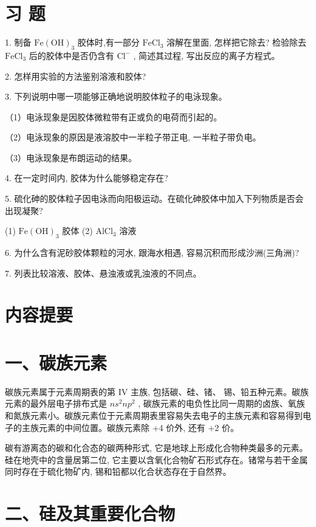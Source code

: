 \documentclass[10pt]{article}
\begin{document}
\section*{习 题}

1. 制备 \(\mathrm{{Fe}}{\left( \mathrm{{OH}}\right) }_{3}\) 胶体时,有一部分 \({\mathrm{{FeCl}}}_{3}\) 溶解在里面, 怎样把它除去? 检验除去 \({\mathrm{{FeCl}}}_{3}\) 后的胶体中是否仍含有 \({\mathrm{{Cl}}}^{ - }\) , 简述其过程, 写出反应的离子方程式。

2. 怎样用实验的方法鉴别溶液和胶体?

3. 下列说明中哪一项能够正确地说明胶体粒子的电泳现象。

（1）电泳现象是因胶体微粒带有正或负的电荷而引起的。

（2）电泳现象的原因是液溶胶中一半粒子带正电, 一半粒子带负电。

（3）电泳现象是布朗运动的结果。

4. 在一定时间内, 胶体为什么能够稳定存在?

5. 硫化砷的胶体粒子因电泳而向阳极运动。在硫化砷胶体中加入下列物质是否会出现凝聚?

(1) \(\mathrm{{Fe}}{\left( \mathrm{{OH}}\right) }_{3}\) 胶体 (2) \({\mathrm{{AlCl}}}_{3}\) 溶液

6. 为什么含有泥砂胶体颗粒的河水, 跟海水相遇, 容易沉积而形成沙洲(三角洲)?

7. 列表比较溶液、胶体、悬浊液或乳浊液的不同点。

\section*{内容提要}

\section*{一、碳族元素}

碳族元素属于元素周期表的第 IV 主族, 包括碳、硅、锗、 锡、铅五种元素。碳族元素的最外层电子排布式是 \(n{s}^{2}n{p}^{2}\) , 碳族元素的电负性比同一周期的卤族、氧族和氮族元素小。碳族元素位于元素周期表里容易失去电子的主族元素和容易得到电子的主族元素的中间位置。碳族元素除 +4 价外, 还有 \(+ 2\) 价。

碳有游离态的碳和化合态的碳两种形式, 它是地球上形成化合物种类最多的元素。硅在地壳中的含量居第二位, 它主要以含氧化合物矿石形式存在。锗常与若干金属同时存在于硫化物矿内, 锡和铅都以化合状态存在于自然界。

\section*{二、硅及其重要化合物}
\end{document}
